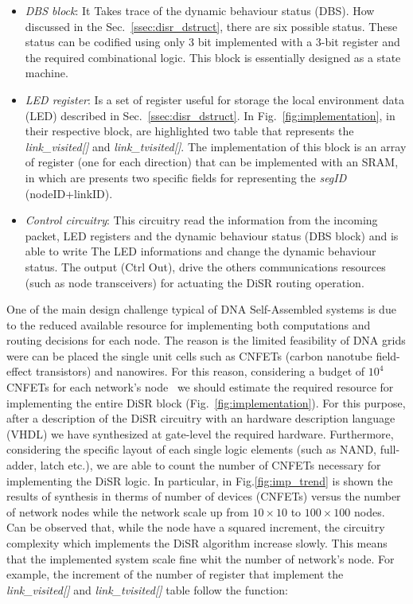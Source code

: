 \begin{itemize}
\item \emph{DBS block}: It Takes trace of the dynamic behaviour status (DBS). 
      How discussed in the Sec.~\ref{ssec:disr_dstruct}, there are six possible status. 
      These status can be codified using only 3 bit implemented with a 3-bit register 
      and the required combinational logic. This block is essentially designed as a state machine.
\item \emph{LED register}: Is a set of register useful for storage the local environment data (LED)
      described in Sec.~\ref{ssec:disr_dstruct}. In Fig.~\ref{fig:implementation}, in their 
      respective block, are highlighted two table that represents the \emph{link\_visited[]} 
      and \emph{link\_tvisited[]}. The implementation of this block is an array of register 
      (one for each direction) that can be implemented with an SRAM, in which are presents two 
      specific fields  for representing the \emph{segID} (nodeID+linkID). 
\item \emph{Control circuitry}: This circuitry read the information from the incoming packet, 
      LED registers and the dynamic behaviour status (DBS block) and is able to write The LED
      informations and change the dynamic behaviour status. The output (Ctrl Out), drive 
      the others communications resources (such as node transceivers) for actuating the DiSR 
      routing operation.
\end{itemize}

One of the main design challenge typical of DNA Self-Assembled systems is due to the
reduced available resource  for implementing both computations and routing decisions for each node. 
The reason is the limited feasibility of DNA grids were can be placed the single unit cells such 
as CNFETs (carbon nanotube field-effect transistors) and nanowires.
For this reason, considering a budget of $10^4$ CNFETs for each network's node~\cite{liu_jetcs}
we should estimate the required resource for implementing the entire DiSR block 
(Fig.~\ref{fig:implementation}). For this purpose, after a description of the DiSR circuitry 
with an hardware description language (VHDL) we have synthesized at gate-level the required 
hardware. Furthermore, considering the specific layout of each single logic elements 
(such as NAND, full-adder, latch etc.), we are able to count the number of CNFETs 
necessary for implementing the DiSR logic. 
In particular, in Fig.\ref{fig:imp_trend} is shown the results of synthesis in therms 
of number of devices (CNFETs) versus the number of network nodes while the network scale 
up from $10\times10$ to $100\times100$ nodes. Can be observed that, while the node have
a squared increment, the circuitry complexity which implements the DiSR algorithm increase slowly. 
This means that the implemented system scale fine whit the number of network's node. 
For example, the increment of the number of register that implement the \emph{link\_visited[]} 
and \emph{link\_tvisited[]} table follow the function:

